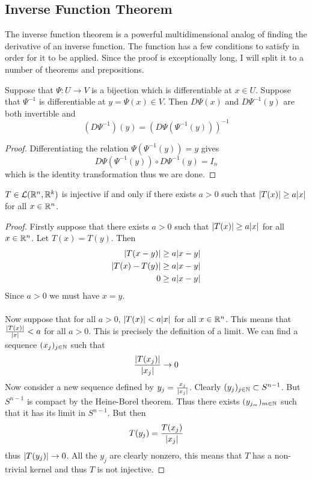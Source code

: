 \documentclass[a4paper]{article}
\begin{document}
\subsection{Inverse Function Theorem}
The inverse function theorem is a powerful multidimensional analog of finding the derivative of an inverse function. The function has a few conditions to satisfy in order for it to be applied. Since the proof is exceptionally long, I will split it to a number of theorems and prepositions. 
\begin{prp}{}{} Suppose that $\Psi:U\to V$ is a bijection which is differentiable at $x\in U$. Suppose that $\Psi^{-1}$ is differentiable at $y=\Psi(x)\in V$. Then $D\Psi(x)$ and $D\Psi^{-1}(y)$ are both invertible and $$(D\Psi^{-1})(y)=(D\Psi(\Psi^{-1}(y)))^{-1}$$ \tcbline
\begin{proof}
Differentiating the relation $\Psi(\Psi^{-1}(y))=y$ gives $$D\Psi(\Psi^{-1}(y))\circ D\Psi^{-1}(y)=I_n$$ which is the identity transformation thus we are done. 
\end{proof}
\end{prp}

\begin{lmm}{}{} $T\in\mathcal{L}(\mathbb{R}^n,\mathbb{R}^k)$ is injective if and only if there exists $a>0$ such that $\abs{T(x)}\geq a\abs{x}$ for all $x\in\mathbb{R}^n$. \tcbline
\begin{proof}
Firstly suppose that there exists $a>0$ such that $\abs{T(x)}\geq a\abs{x}$ for all $x\in\mathbb{R}^n$. Let $T(x)=T(y)$. Then 
\begin{align*}
\abs{T(x-y)}&\geq a\abs{x-y}\\
\abs{T(x)-T(y)}&\geq a\abs{x-y}\\
0&\geq a\abs{x-y}
\end{align*}
Since $a>0$ we must have $x=y$. \\~\\
Now suppose that for all $a>0$, $\abs{T(x)}<a\abs{x}$ for all $x\in\mathbb{R}^n$. This means that $\frac{\abs{T(x)}}{\abs{x}}<a$ for all $a>0$. This is precisely the definition of a limit. We can find a sequence $(x_j)_{j\in\mathbb{N}}$ such that $$\frac{\abs{T(x_j)}}{\abs{x_j}}\to 0$$ Now consider a new sequence defined by $y_j=\frac{x_j}{\abs{x_j}}$. Clearly $(y_j)_{j\in\mathbb{N}}\subset S^{n-1}$. But $S^{n-1}$ is compact by the Heine-Borel theorem. Thus there exists $(y_{j_m})_{m\in\mathbb{N}}$ such that it has its limit in $S^{n-1}$. But then $$T(y_j)=\frac{T(x_j)}{\abs{x_j}}$$ thus $\abs{T(y_j)}\to 0$. All the $y_j$ are clearly nonzero, this means that $T$ has a non-trivial kernel and thus $T$ is not injective. 
\end{proof}
\end{lmm}
\end{document}
